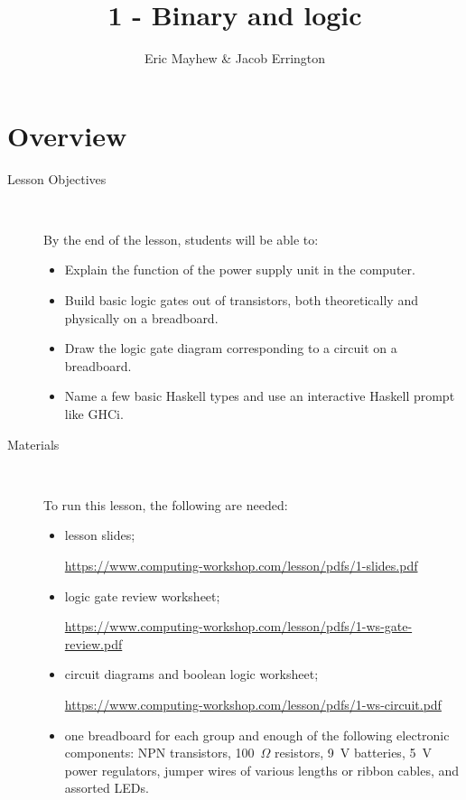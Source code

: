 \documentclass[11pt]{article}
\title{1 - Binary and logic}
\author{Eric Mayhew \& Jacob Errington}
\date{}
\newcommand{\cwurl}{https://www.computing-workshop.com/lesson/pdfs/}
\begin{document}
\maketitle

\section*{Overview}

\begin{description}
  \item[Lesson Objectives] ~

   By the end of the lesson, students will be able to:

  \begin{itemize}
    \item Explain the function of the power supply unit in the computer.

    \item Build basic logic gates out of transistors, both theoretically and
      physically on a breadboard.

    \item Draw the logic gate diagram corresponding to a circuit on a
      breadboard.

    \item Name a few basic Haskell types and use an interactive Haskell prompt
      like GHCi.
  \end{itemize}

  \item [Materials]~

    To run this lesson, the following are needed:

    \begin{itemize}
      \item
        lesson slides;

        \url{\cwurl 1-slides.pdf}

      \item
        logic gate review worksheet;

        \url{\cwurl 1-ws-gate-review.pdf}

      \item
        circuit diagrams and boolean logic worksheet;

        \url{\cwurl 1-ws-circuit.pdf}

      \item
        one breadboard for each group and enough of the following electronic
        components:
        NPN transistors,
        100~$\Omega$ resistors,
        9~V batteries,
        5~V power regulators,
        jumper wires of various lengths or ribbon cables,
        and assorted LEDs.

    \end{itemize}
\end{description}
\end{document}

